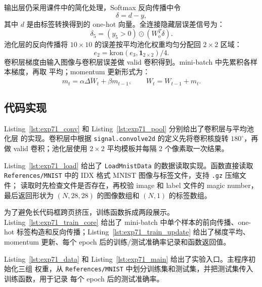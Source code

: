 \documentclass[10.5pt]{config}
\newcommand{\codeinput}[5]{%
}
\begin{document}
输出层仍采用课件中的简化处理，Softmax 反向传播中令
\[
\delta=d-y,
\]
其中 $d$ 是由标签转换得到的 one-hot 向量。全连接隐藏层误差信号为：
\[
\delta_5=(y_5>0)\odot(W_o^T\delta).
\]
池化层的反向传播将 $10\times10$ 的误差按平均池化权重均匀分配回 $2\times2$ 区域：
\[
e_2=\mathrm{kron}(e_3,\mathbf{1}_{2\times2})/4.
\]
卷积层梯度由输入图像与卷积层误差做 valid 卷积得到。mini-batch 中先累积各样本梯度，再取
平均；momentum 更新形式为：
\[
m_t=\alpha \overline{\Delta W_t}+\beta m_{t-1},\qquad
W_t=W_{t-1}+m_t.
\]

\subsection{代码实现}

Listing~\ref{lst:exp71_conv} 和 Listing~\ref{lst:exp71_pool} 分别给出了卷积层与平均池化层
的实现。卷积层中根据 \texttt{signal.convolve2d} 的定义先将卷积核旋转 $180^\circ$，再做
valid 卷积；池化层使用 $2\times2$ 平均模板并每隔 2 个像素取一次结果。

\codeinput{../Code/EXP7/Conv.py}{lst:exp71_conv}{Conv.py：卷积层定义}{1}{19}

\codeinput{../Code/EXP7/Pool.py}{lst:exp71_pool}{Pool.py：平均池化层定义}{1}{14}

Listing~\ref{lst:exp71_load} 给出了 \texttt{LoadMnistData} 的数据读取实现。函数直接读取
\texttt{References/MNIST} 中的 IDX 格式 MNIST 图像与标签文件，支持 \texttt{.gz} 压缩文件；
读取时先检查文件是否存在，再校验 image 和 label 文件的 magic number，最后返回形状为
$(N,28,28)$ 的图像数组和 $(N,1)$ 的标签数组。

\codeinput{../Code/EXP7/LoadMnistData.py}{lst:exp71_load}{LoadMnistData.py：MNIST数据读取函数}{8}{41}

为了避免长代码框跨页挤压，训练函数拆成两段展示。Listing~\ref{lst:exp71_train_core}
给出了 mini-batch 中单个样本的前向传播、one-hot 标签构造和反向传播；Listing~\ref{lst:exp71_train_update}
给出了梯度平均、momentum 更新、每个 epoch 后的训练/测试准确率记录和函数返回值。

\codeinput{../Code/EXP7/MnistConv.py}{lst:exp71_train_core}{MnistConv.py：CNN前向传播与反向传播核心}{18}{84}

\codeinput{../Code/EXP7/MnistConv.py}{lst:exp71_train_update}{MnistConv.py：mini-batch平均、momentum更新与准确率记录}{86}{107}

Listing~\ref{lst:exp71_data} 和 Listing~\ref{lst:exp71_main} 给出了实验入口。主程序初始化三组
权重，从 \texttt{References/MNIST} 中划分训练集和测试集，并把测试集传入训练函数，用于记录
每个 epoch 后的测试准确率。
\end{document}
